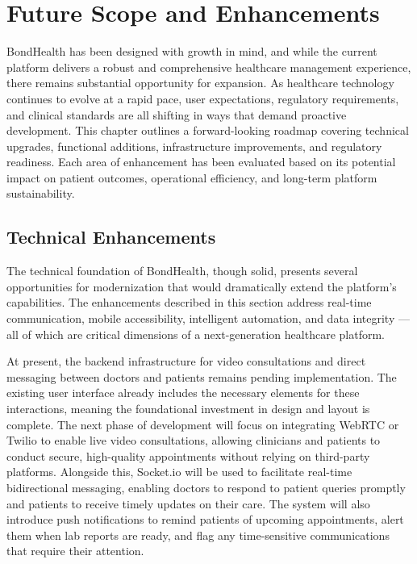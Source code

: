 \chapter{Future Scope and Enhancements}

\noindent BondHealth has been designed with growth in mind, and while the current platform delivers a robust and comprehensive healthcare management experience, there remains substantial opportunity for expansion. As healthcare technology continues to evolve at a rapid pace, user expectations, regulatory requirements, and clinical standards are all shifting in ways that demand proactive development. This chapter outlines a forward-looking roadmap covering technical upgrades, functional additions, infrastructure improvements, and regulatory readiness. Each area of enhancement has been evaluated based on its potential impact on patient outcomes, operational efficiency, and long-term platform sustainability.

\section{Technical Enhancements}

\noindent The technical foundation of BondHealth, though solid, presents several opportunities for modernization that would dramatically extend the platform's capabilities. The enhancements described in this section address real-time communication, mobile accessibility, intelligent automation, and data integrity --- all of which are critical dimensions of a next-generation healthcare platform.

\noindent At present, the backend infrastructure for video consultations and direct messaging between doctors and patients remains pending implementation. The existing user interface already includes the necessary elements for these interactions, meaning the foundational investment in design and layout is complete. The next phase of development will focus on integrating WebRTC or Twilio to enable live video consultations, allowing clinicians and patients to conduct secure, high-quality appointments without relying on third-party platforms. Alongside this, Socket.io will be used to facilitate real-time bidirectional messaging, enabling doctors to respond to patient queries promptly and patients to receive timely updates on their care. The system will also introduce push notifications to remind patients of upcoming appointments, alert them when lab reports are ready, and flag any time-sensitive communications that require their attention.

